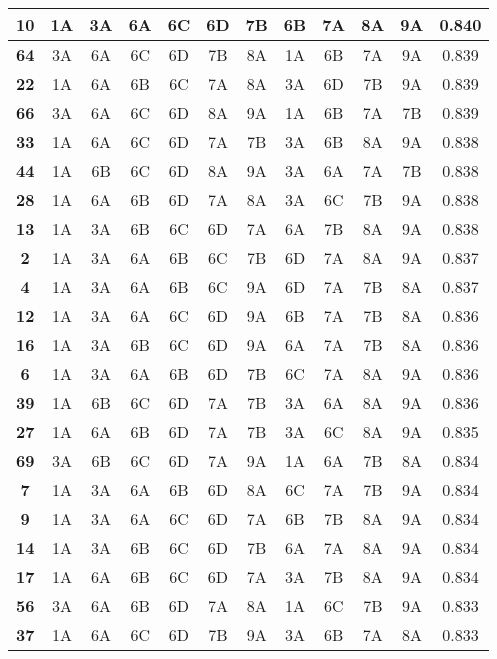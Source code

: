 \begin{table}[h!]
{\begin{tabular}{|c||c|c|c|c|c|c||c|c|c|c||c|}
\hline
\textbf{10} & 1A & 3A & 6A & 6C & 6D & 7B & 6B & 7A & 8A & 9A & 0.840 \\
\hline
\textbf{64} & 3A & 6A & 6C & 6D & 7B & 8A & 1A & 6B & 7A & 9A & 0.839 \\
\hline
\textbf{22} & 1A & 6A & 6B & 6C & 7A & 8A & 3A & 6D & 7B & 9A & 0.839 \\
\hline
\textbf{66} & 3A & 6A & 6C & 6D & 8A & 9A & 1A & 6B & 7A & 7B & 0.839 \\
\hline
\textbf{33} & 1A & 6A & 6C & 6D & 7A & 7B & 3A & 6B & 8A & 9A & 0.838 \\
\hline
\textbf{44} & 1A & 6B & 6C & 6D & 8A & 9A & 3A & 6A & 7A & 7B & 0.838 \\
\hline
\textbf{28} & 1A & 6A & 6B & 6D & 7A & 8A & 3A & 6C & 7B & 9A & 0.838 \\
\hline
\textbf{13} & 1A & 3A & 6B & 6C & 6D & 7A & 6A & 7B & 8A & 9A & 0.838 \\
\hline
\textbf{2} & 1A & 3A & 6A & 6B & 6C & 7B & 6D & 7A & 8A & 9A & 0.837 \\
\hline
\textbf{4} & 1A & 3A & 6A & 6B & 6C & 9A & 6D & 7A & 7B & 8A & 0.837 \\
\hline
\textbf{12} & 1A & 3A & 6A & 6C & 6D & 9A & 6B & 7A & 7B & 8A & 0.836 \\
\hline
\textbf{16} & 1A & 3A & 6B & 6C & 6D & 9A & 6A & 7A & 7B & 8A & 0.836 \\
\hline
\textbf{6} & 1A & 3A & 6A & 6B & 6D & 7B & 6C & 7A & 8A & 9A & 0.836 \\
\hline
\textbf{39} & 1A & 6B & 6C & 6D & 7A & 7B & 3A & 6A & 8A & 9A & 0.836 \\
\hline
\textbf{27} & 1A & 6A & 6B & 6D & 7A & 7B & 3A & 6C & 8A & 9A & 0.835 \\
\hline
\textbf{69} & 3A & 6B & 6C & 6D & 7A & 9A & 1A & 6A & 7B & 8A & 0.834 \\
\hline
\textbf{7} & 1A & 3A & 6A & 6B & 6D & 8A & 6C & 7A & 7B & 9A & 0.834 \\
\hline
\textbf{9} & 1A & 3A & 6A & 6C & 6D & 7A & 6B & 7B & 8A & 9A & 0.834 \\
\hline
\textbf{14} & 1A & 3A & 6B & 6C & 6D & 7B & 6A & 7A & 8A & 9A & 0.834 \\
\hline
\textbf{17} & 1A & 6A & 6B & 6C & 6D & 7A & 3A & 7B & 8A & 9A & 0.834 \\
\hline
\textbf{56} & 3A & 6A & 6B & 6D & 7A & 8A & 1A & 6C & 7B & 9A & 0.833 \\
\hline
\textbf{37} & 1A & 6A & 6C & 6D & 7B & 9A & 3A & 6B & 7A & 8A & 0.833 \\

\end{tabular}}
\end{table}
